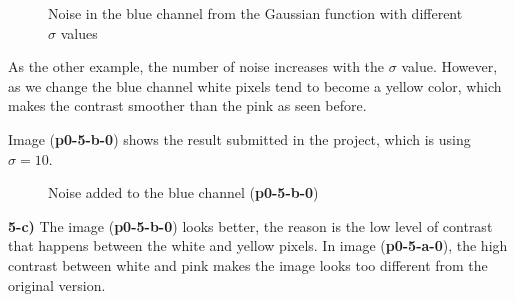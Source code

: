\documentclass[12pt,a4paper]{article}
\begin{document}
\begin{figure}[!h]
	\quad
	\caption{Noise in the blue channel  from the Gaussian function with different $\sigma$ values}%
	\label{fig:blue-sigma}%
\end{figure}

As the other example, the number of noise increases with the $\sigma$ value. However, as we change the blue channel white pixels tend to become a yellow color, which makes the contrast smoother than the pink as seen before.

Image (\textbf{p0-5-b-0}) shows the result submitted in the project, which is using $\sigma = 10$.

\begin{figure}[!h]
	\centering
	{%
		\setlength{\fboxsep}{1pt}%
		\setlength{\fboxrule}{1pt}%
	}%
	\caption{Noise added to the blue channel (\textbf{p0-5-b-0})}
	\label{fig:p0-5-b-0}
\end{figure}


\textbf{5-c) } The image (\textbf{p0-5-b-0}) looks better, the reason is the low level of contrast that happens between the white and yellow pixels. In image (\textbf{p0-5-a-0}), the high contrast between white and pink makes the image looks too different from the original version.
\end{document}
